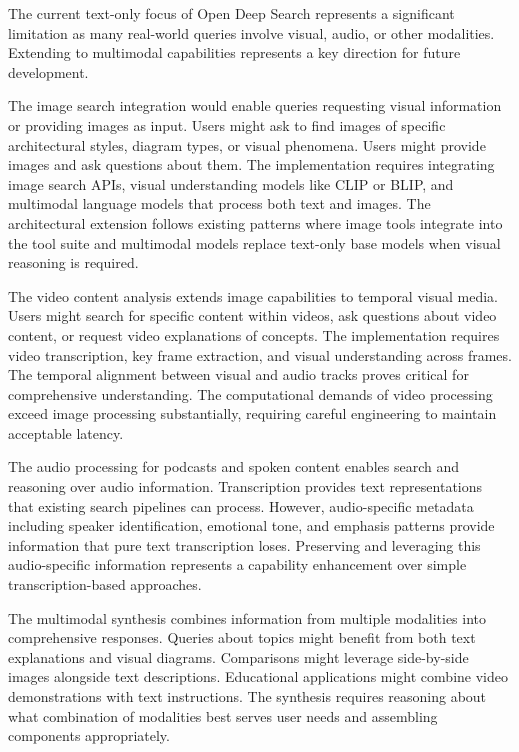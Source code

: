 The current text-only focus of Open Deep Search represents a significant limitation as many real-world queries involve visual, audio, or other modalities. Extending to multimodal capabilities represents a key direction for future development.

The image search integration would enable queries requesting visual information or providing images as input. Users might ask to find images of specific architectural styles, diagram types, or visual phenomena. Users might provide images and ask questions about them. The implementation requires integrating image search APIs, visual understanding models like CLIP or BLIP, and multimodal language models that process both text and images. The architectural extension follows existing patterns where image tools integrate into the tool suite and multimodal models replace text-only base models when visual reasoning is required.

The video content analysis extends image capabilities to temporal visual media. Users might search for specific content within videos, ask questions about video content, or request video explanations of concepts. The implementation requires video transcription, key frame extraction, and visual understanding across frames. The temporal alignment between visual and audio tracks proves critical for comprehensive understanding. The computational demands of video processing exceed image processing substantially, requiring careful engineering to maintain acceptable latency.

The audio processing for podcasts and spoken content enables search and reasoning over audio information. Transcription provides text representations that existing search pipelines can process. However, audio-specific metadata including speaker identification, emotional tone, and emphasis patterns provide information that pure text transcription loses. Preserving and leveraging this audio-specific information represents a capability enhancement over simple transcription-based approaches.

The multimodal synthesis combines information from multiple modalities into comprehensive responses. Queries about topics might benefit from both text explanations and visual diagrams. Comparisons might leverage side-by-side images alongside text descriptions. Educational applications might combine video demonstrations with text instructions. The synthesis requires reasoning about what combination of modalities best serves user needs and assembling components appropriately.

